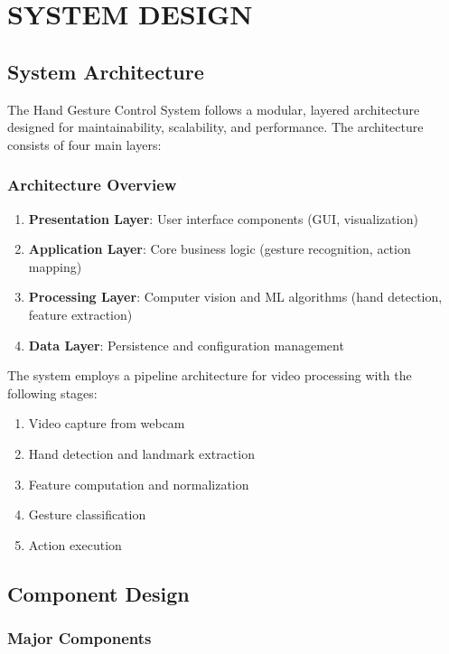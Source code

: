 \documentclass[12pt,a4paper]{report}
\begin{document}
\clearpage
\chapter{SYSTEM DESIGN}

\section{System Architecture}

The Hand Gesture Control System follows a modular, layered architecture designed for maintainability, scalability, and performance. The architecture consists of four main layers:

\subsection{Architecture Overview}

\begin{enumerate}
    \item \textbf{Presentation Layer}: User interface components (GUI, visualization)
    \item \textbf{Application Layer}: Core business logic (gesture recognition, action mapping)
    \item \textbf{Processing Layer}: Computer vision and ML algorithms (hand detection, feature extraction)
    \item \textbf{Data Layer}: Persistence and configuration management
\end{enumerate}

The system employs a pipeline architecture for video processing with the following stages:
\begin{enumerate}
    \item Video capture from webcam
    \item Hand detection and landmark extraction
    \item Feature computation and normalization
    \item Gesture classification
    \item Action execution
\end{enumerate}

\section{Component Design}

\subsection{Major Components}
\end{document}
